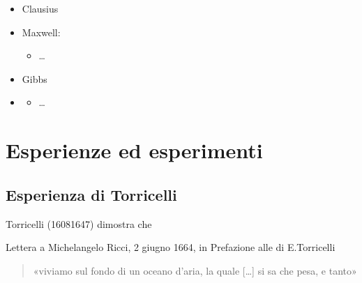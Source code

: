 \documentclass[letterpaper,10pt,italian]{jupyterBook}
\begin{document}
\sphinxAtStartPar
{}
\begin{itemize}
\item {} 
\sphinxAtStartPar
Clausius

\item {} 
\sphinxAtStartPar
Maxwell:
\begin{itemize}
\item {} 
\sphinxAtStartPar
…

\end{itemize}

\item {} 
\sphinxAtStartPar
Gibbs

\item {} 
\sphinxAtStartPar
{}
\begin{itemize}
\item {} 
\sphinxAtStartPar
…

\end{itemize}

\end{itemize}



\sphinxstepscope


\section{Esperienze ed esperimenti}
\label{\detokenize{ch/thermodynamics/foundation-experiments:esperienze-ed-esperimenti}}\label{\detokenize{ch/thermodynamics/foundation-experiments:physics-hs-thermodynamics-foundation-experiments}}\label{\detokenize{ch/thermodynamics/foundation-experiments::doc}}

\subsection{Esperienza di Torricelli}
\label{\detokenize{ch/thermodynamics/foundation-experiments:esperienza-di-torricelli}}
\sphinxAtStartPar
Torricelli (1608\sphinxhyphen{}1647) dimostra che%
\begin{footnote}[1]\sphinxAtStartFootnote
Lettera a Michelangelo Ricci, 2 giugno 1664, in Prefazione alle  di E.Torricelli
%
\end{footnote}
\begin{quote}

\sphinxAtStartPar
«viviamo sul fondo di un oceano d’aria, la quale {[}…{]} si sa che pesa, e tanto»
\end{quote}
\end{document}
